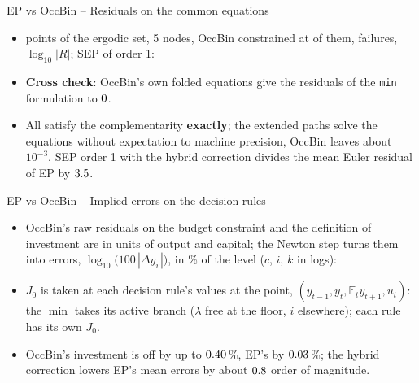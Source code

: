 \documentclass[11pt,aspectratio=169]{beamer}
\newcommand{\E}{\mathbb{E}}
\newcommand{\code}[1]{\texttt{#1}}
\begin{document}
\begin{frame}{EP vs OccBin -- Residuals on the common equations}

\begin{itemize}

\item \irrPoints{} points of the ergodic set, 5 nodes, OccBin constrained at \irrBinding{} of them, \irrFailures{} failures, $\log_{10}|R|$; SEP of order 1:
\begin{center}
\small
{\footnotesize}
\end{center}

\item \textbf{Cross check}: OccBin's own folded equations give the residuals of the \code{min} formulation to $0$.\newline

\item All satisfy the complementarity \textbf{exactly}; the extended paths solve the equations without expectation to machine precision, OccBin leaves about $10^{-3}$. SEP order 1 with the hybrid correction divides the mean Euler residual of EP by $3.5$.

\end{itemize}

\end{frame}

\begin{frame}{EP vs OccBin -- Implied errors on the decision rules}

\begin{itemize}

\item OccBin's raw residuals on the budget constraint and the definition of investment are in units of output and capital; the Newton step turns them into errors, $\log_{10}\bigl(100\,|\Delta y_v|\bigr)$, in \% of the level ($c$, $i$, $k$ in logs):
\begin{center}
\footnotesize

\end{center}

\item $J_0$ is taken at each decision rule's values at the point, $(y_{t-1}, y_t, \E_t y_{t+1}, u_t)$: the $\min$ takes its active branch ($\lambda$ free at the floor, $i$ elsewhere); each rule has its own $J_0$.\newline

\item OccBin's investment is off by up to $0.40$\,\%, EP's by $0.03$\,\%; the hybrid correction lowers EP's mean errors by about $0.8$ order of magnitude.

\end{itemize}

\end{frame}
\end{document}
